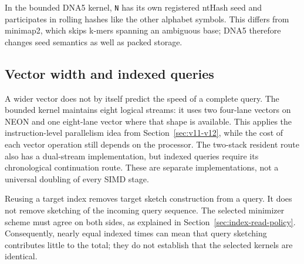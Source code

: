 In the bounded DNA5 kernel, \texttt{N} has its own registered ntHash seed
and participates in rolling hashes like the other alphabet symbols.
This differs from minimap2, which skips k-mers spanning an ambiguous base;
DNA5 therefore changes seed semantics as well as packed storage.

\subsection{Vector width and indexed queries}
\label{sec:minimizer-width-and-query-work}

A wider vector does not by itself predict the speed of a complete query.
The bounded kernel maintains eight logical streams: it uses two four-lane
vectors on NEON and one eight-lane vector where that shape is available.
This applies the instruction-level parallelism idea from
Section~\ref{sec:v11-v12}, while the cost of each vector operation still
depends on the processor. The two-stack resident route also has a dual-stream
implementation, but indexed queries require its chronological continuation
route. These are separate implementations, not a universal doubling of every
SIMD stage.

Reusing a target index removes target sketch construction from a query.
It does not remove sketching of the incoming query sequence. The selected
minimizer scheme must agree on both sides, as explained in
Section~\ref{sec:index-read-policy}. Consequently, nearly equal indexed
times can mean that query sketching contributes little to the total; they
do not establish that the selected kernels are identical.





